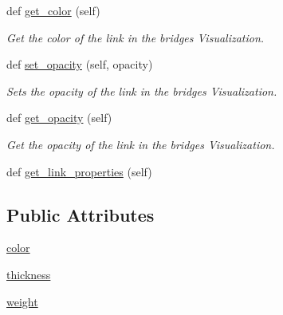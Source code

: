 \begin{DoxyCompactItemize}
def \hyperlink{classbridges_1_1link__visualizer_1_1_link_visualizer_aaff73e6c3c3fb6c4679ff7e43c2729fd}{get\+\_\+color} (self)
\begin{DoxyCompactList}\small\item\em Get the color of the link in the bridges Visualization. \end{DoxyCompactList}\item 
def \hyperlink{classbridges_1_1link__visualizer_1_1_link_visualizer_ae9c3b5a249a4d71d97d8bb3186a17e63}{set\+\_\+opacity} (self, opacity)
\begin{DoxyCompactList}\small\item\em Sets the opacity of the link in the bridges Visualization. \end{DoxyCompactList}\item 
def \hyperlink{classbridges_1_1link__visualizer_1_1_link_visualizer_a5bde29170a1a59b3e2f4d75dd9e13be9}{get\+\_\+opacity} (self)
\begin{DoxyCompactList}\small\item\em Get the opacity of the link in the bridges Visualization. \end{DoxyCompactList}\item 
def \hyperlink{classbridges_1_1link__visualizer_1_1_link_visualizer_a4115c919bee0422f4f22308cba0c5c99}{get\+\_\+link\+\_\+properties} (self)
\end{DoxyCompactItemize}
\subsection*{Public Attributes}
\begin{DoxyCompactItemize}
\item 
\hyperlink{classbridges_1_1link__visualizer_1_1_link_visualizer_a253b0bdccb0a385f0ac0f14b97a18ed1}{color}
\item 
\hyperlink{classbridges_1_1link__visualizer_1_1_link_visualizer_ae7e964f66a674b68801e0b37304de19e}{thickness}
\item 
\hyperlink{classbridges_1_1link__visualizer_1_1_link_visualizer_ad53c209a7b8a7ad5b3d441a198f7a068}{weight}
\end{DoxyCompactItemize}
